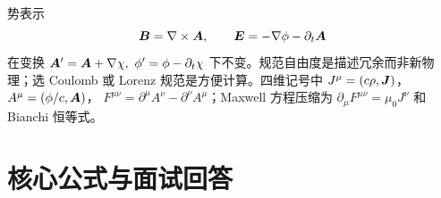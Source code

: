 势表示
\[
\bm{B}=\nabla\times\bm{A},\qquad
\bm{E}=-\nabla\phi-\partial_t\bm{A}
\]
在变换
$\vb A'=\vb A+\nabla\chi,\ \phi'=\phi-\partial_t\chi$ 下不变。规范自由度是描述冗余而非新物理；选 Coulomb 或 Lorenz 规范是方便计算。四维记号中
$J^\mu=(c\rho,\bm{J})$，$A^\mu=(\phi/c,\bm{A})$，
$F^{\mu\nu}=\partial^\mu A^\nu-\partial^\nu A^\mu$；Maxwell 方程压缩为
$\partial_\mu F^{\mu\nu}=\mu_0J^\nu$ 和 Bianchi 恒等式。

\section{核心公式与面试回答}
